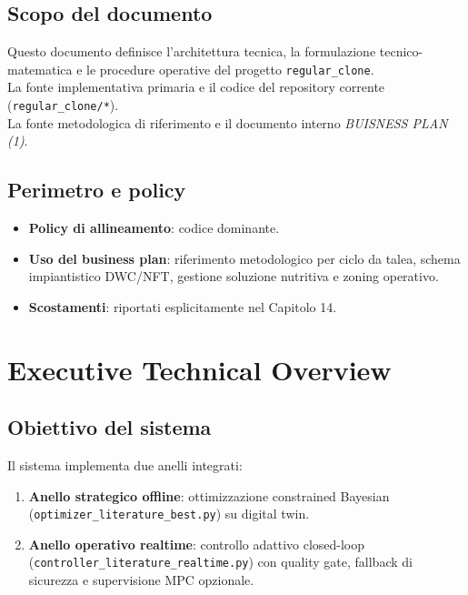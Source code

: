 ﻿\documentclass[11pt,a4paper]{report}
\begin{document}
\section{Scopo del documento}
Questo documento definisce l'architettura tecnica, la formulazione tecnico-matematica e le procedure operative del progetto \texttt{regular\_clone}.\\
La fonte implementativa primaria e il codice del repository corrente (\texttt{regular\_clone/*}).\\
La fonte metodologica di riferimento e il documento interno \emph{BUISNESS PLAN (1)}.

\section{Perimetro e policy}
\begin{itemize}
  \item \textbf{Policy di allineamento}: codice dominante.
  \item \textbf{Uso del business plan}: riferimento metodologico per ciclo da talea, schema impiantistico DWC/NFT, gestione soluzione nutritiva e zoning operativo.
  \item \textbf{Scostamenti}: riportati esplicitamente nel Capitolo 14.
\end{itemize}

\newpage
\chapter{Executive Technical Overview}

\section{Obiettivo del sistema}
Il sistema implementa due anelli integrati:
\begin{enumerate}
  \item \textbf{Anello strategico offline}: ottimizzazione constrained Bayesian (\texttt{optimizer\_literature\_best.py}) su digital twin.
  \item \textbf{Anello operativo realtime}: controllo adattivo closed-loop (\texttt{controller\_literature\_realtime.py}) con quality gate, fallback di sicurezza e supervisione MPC opzionale.
\end{enumerate}
\end{document}
